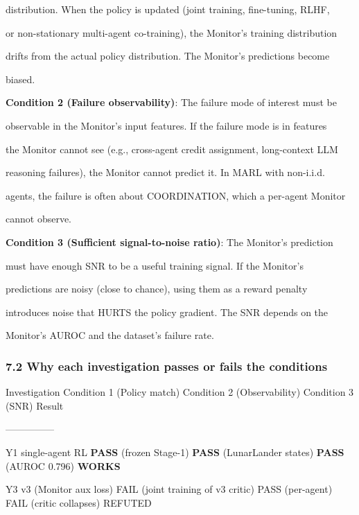 \documentclass[11pt]{article}
\begin{document}
distribution. When the policy is updated (joint training, fine-tuning,
RLHF,

or non-stationary multi-agent co-training), the Monitor's training
distribution

drifts from the actual policy distribution. The Monitor's predictions
become

biased.

\textbf{Condition 2 (Failure observability)}: The failure mode of
interest must be

observable in the Monitor's input features. If the failure mode is in
features

the Monitor cannot see (e.g., cross-agent credit assignment,
long-context LLM

reasoning failures), the Monitor cannot predict it. In MARL with
non-i.i.d.

agents, the failure is often about COORDINATION, which a per-agent
Monitor

cannot observe.

\textbf{Condition 3 (Sufficient signal-to-noise ratio)}: The Monitor's
prediction

must have enough SNR to be a useful training signal. If the Monitor's

predictions are noisy (close to chance), using them as a reward penalty

introduces noise that HURTS the policy gradient. The SNR depends on the

Monitor's AUROC and the dataset's failure rate.

\subsubsection{7.2 Why each investigation passes or fails the
conditions}\label{why-each-investigation-passes-or-fails-the-conditions}

Investigation \textbar{} Condition 1 (Policy match) \textbar{} Condition
2 (Observability) \textbar{} Condition 3 (SNR) \textbar{} Result
\textbar{}

\textbar---\textbar---\textbar---\textbar---\textbar---\textbar{}

Y1 single-agent RL \textbar{} \textbf{PASS} (frozen Stage-1) \textbar{}
\textbf{PASS} (LunarLander states) \textbar{} \textbf{PASS} (AUROC
0.796) \textbar{} \textbf{WORKS} \textbar{}

Y3 v3 (Monitor aux loss) \textbar{} FAIL (joint training of v3 critic)
\textbar{} PASS (per-agent) \textbar{} FAIL (critic collapses)
\textbar{} REFUTED \textbar{}
\end{document}
